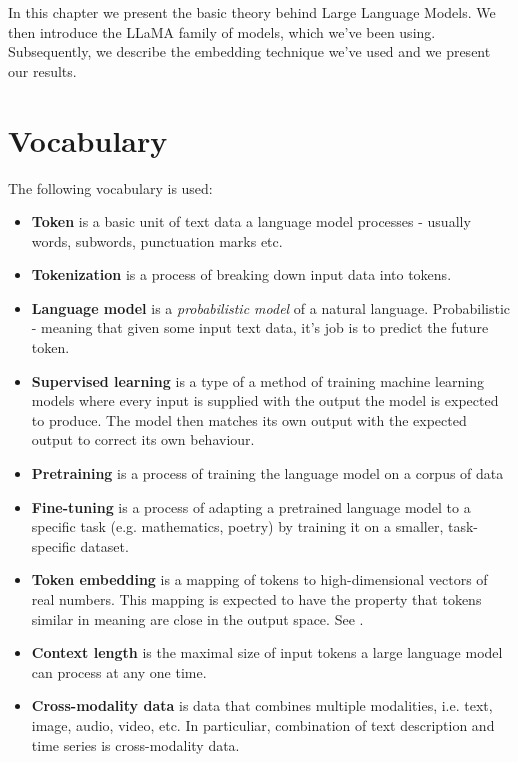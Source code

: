 In this chapter we present the basic theory behind Large Language Models. We then introduce the LLaMA family of models, which we've been using. Subsequently, we describe the embedding technique we've used and we present our results.

\section{Vocabulary}

The following vocabulary is used:
\begin{itemize}
	\item \textbf{Token} is a basic unit of text data a language model processes - usually words, subwords, punctuation marks etc.

	\item \textbf{Tokenization} is a process of breaking down input data into tokens.

	\item \textbf{Language model} is a \textit{probabilistic model} of a natural language. Probabilistic - meaning that given some input text data, it's job is to predict the future token. \cite{language_models}

	\item \textbf{Supervised learning} is a type of a method of training machine learning models where every input is supplied with the output the model is expected to produce. The model then matches its own output with the expected output to correct its own behaviour.

	\item \textbf{Pretraining} is a process of training the language model on a corpus of data

	\item \textbf{Fine-tuning} is a process of adapting a pretrained language model to a specific task (e.g. mathematics, poetry) by training it on a smaller, task-specific dataset.

	\item \textbf{Token embedding} is a mapping of tokens to high-dimensional vectors of real numbers. This mapping is expected to have the property that tokens similar in meaning are close in the output space. See \cite{token_embeddings}.

	\item \textbf{Context length} is the maximal size of input tokens a large language model can process at any one time.

	\item \textbf{Cross-modality data} is data that combines multiple modalities, i.e. text, image, audio, video, etc. In particuliar, combination of text description and time series is cross-modality data.

\end{itemize}

